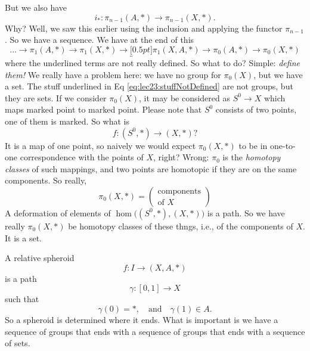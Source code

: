 But we also have
\begin{equation}
i_{*}\colon\pi_{n-1}(A,*)\to\pi_{n-1}(X,*).
\end{equation}
Why? Well, we saw this earlier using the inclusion and applying
the functor $\pi_{n-1}$. So we have a sequence. We have at the
end of this
\begin{equation}\label{eq:lec23:stuffNotDefined}
\dots\to\pi_{1}(A,*)\to\pi_{1}(X,*)\to
\underbracket[0.5pt]{\pi_{1}(X,A,*)\to\pi_{0}(A,*)\to\pi_{0}(X,*)}
\end{equation}
where the underlined terms are not really defined. So what to do?
Simple: \emph{define them!} We really have a problem here: we
have no group for $\pi_{0}(X)$, but we have a set. The stuff
underlined in Eq \eqref{eq:lec23:stuffNotDefined} are not groups,
but they are sets. If we consider $\pi_{0}(X)$, it may be
considered as $S^0\to X$ which maps marked point to marked
point. Please note that $S^0$ consists of two points, one of them
is marked. So what is
\begin{equation}
f\colon (S^0,*)\to(X,*)?
\end{equation}
It is a map of one point, so naively we would expect
$\pi_{0}(X,*)$ to be in one-to-one correspondence with the points
of $X$, right? Wrong: $\pi_{0}$ is the \emph{homotopy classes} of
such mappings, and two points are homotopic if they are on the
same components. So really,
\begin{equation}
\pi_{0}(X,*)=\begin{pmatrix}\mbox{components}\\
\mbox{of $X$}
\end{pmatrix}
\end{equation}
A deformation of elements of $\hom\bigl((S^0,*),(X,*)\bigr)$ is a
path. So we have really $\pi_{0}(X,*)$ be homotopy classes of
these thngs, i.e., of the components of $X$. It is a set.

A relative spheroid
\begin{equation}
f\colon I\to(X,A,*)
\end{equation}
is a path
\begin{equation}
\gamma\colon[0,1]\to X
\end{equation}
such that
\begin{equation}
\gamma(0)=*,\quad\mbox{and}\quad
\gamma(1)\in A.
\end{equation}
So a spheroid is determined where it ends. What is important is
we have a sequence of groups that ends with a sequence of groups
that ends with a sequence of sets.

